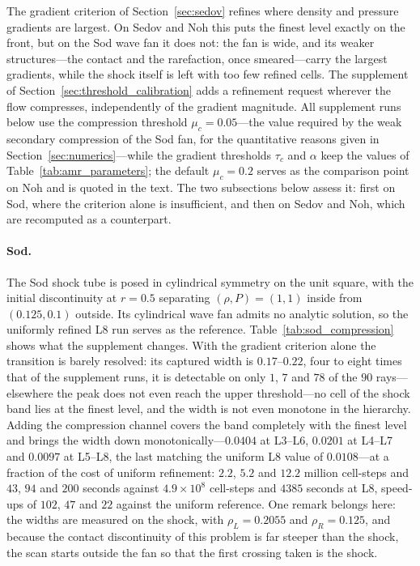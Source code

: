 \documentclass[a4paper]{cas-sc}
\begin{document}
The gradient criterion of Section~\ref{sec:sedov} refines where density and
pressure gradients are largest. On Sedov and Noh this puts the finest level
exactly on the front, but on the Sod wave fan it does not: the fan is wide, and
its weaker structures---the contact and the rarefaction, once smeared---carry
the largest gradients, while the shock itself is left with too few refined
cells. The supplement of Section~\ref{sec:threshold_calibration} adds a
refinement request wherever the flow compresses, independently of the gradient
magnitude. All supplement runs below use the compression threshold
$\mu_c=0.05$---the value required by the weak secondary compression of the Sod
fan, for the quantitative reasons given in
Section~\ref{sec:numerics}---while the
gradient thresholds $\tau_c$ and $\alpha$ keep the values of
Table~\ref{tab:amr_parameters}; the default $\mu_c=0.2$ serves as the
comparison point on Noh and is quoted in the text. The two subsections below assess it: first on Sod, where the
criterion alone is insufficient, and then on Sedov and Noh, which are
recomputed as a counterpart.

\paragraph{Sod.}
The Sod shock tube is posed in cylindrical symmetry on the unit square, with
the initial discontinuity at $r=0.5$ separating $(\rho,P)=(1,1)$ inside from
$(0.125,0.1)$ outside. Its cylindrical wave fan admits no analytic solution,
so the uniformly refined L8 run serves as the reference.
Table~\ref{tab:sod_compression} shows what the supplement changes. With the
gradient criterion alone the transition is barely resolved: its captured width
is $0.17$--$0.22$, four to eight times that of the supplement runs, it is
detectable on only $1$, $7$ and $78$ of the $90$ rays---elsewhere the peak does
not even reach the upper threshold---no cell of the shock band lies at the
finest level, and the width is not even monotone in the hierarchy. Adding the
compression channel covers the band completely with the finest level and brings
the width down monotonically---$0.0404$ at L3--L6, $0.0201$ at L4--L7 and
$0.0097$ at L5--L8, the last matching the uniform L8 value of $0.0108$---at a
fraction of the cost of uniform refinement: $2.2$, $5.2$ and $12.2$ million
cell-steps and $43$, $94$ and $200$ seconds against $4.9\times10^{8}$
cell-steps and $4385$ seconds at L8, speed-ups of $102$, $47$ and $22$ against
the uniform reference. One remark belongs
here: the widths are measured on the shock, with $\rho_L=0.2055$ and
$\rho_R=0.125$, and because the contact discontinuity of this problem is far
steeper than the shock, the scan starts outside the fan so that the first
crossing taken is the shock.
\end{document}
